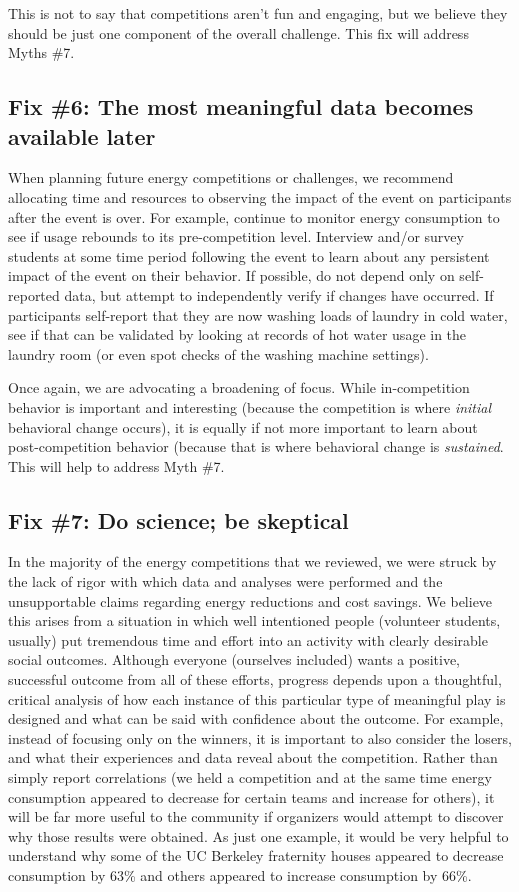 \documentclass[jou]{apa} %
\begin{document}
This is not to say that competitions aren't fun and engaging, but we believe they should
be just one component of the overall challenge.  This fix will address Myths \#7.

\subsection{Fix \#6: The most meaningful data becomes available later}

When planning future energy competitions or challenges, we recommend allocating time and
resources to observing the impact of the event on participants after the event is over.
For example, continue to monitor energy consumption to see if usage rebounds to its
pre-competition level.  Interview and/or survey students at some time period following the
event to learn about any persistent impact of the event on their behavior.  If possible,
do not depend only on self-reported data, but attempt to independently verify if changes
have occurred.  If participants self-report that they are now washing loads of laundry in
cold water,  see if that can be validated by looking at records of hot water usage in the
laundry room (or even spot checks of the washing machine settings). 

Once again, we are advocating a broadening of focus.   While in-competition behavior is
important and interesting (because the competition is where {\em initial} behavioral change
occurs), it is equally if not more important to learn about post-competition behavior
(because that is where behavioral change is {\em sustained}.  This will help to address
Myth \#7.

\subsection{Fix \#7: Do science; be skeptical}

In the majority of the energy competitions that we reviewed, we were struck by the lack of
rigor with which data and analyses were performed and the unsupportable claims regarding
energy reductions and cost savings.  We believe this arises from a situation in which well
intentioned people (volunteer students, usually) put tremendous time and effort into an
activity with clearly desirable social outcomes.  Although everyone (ourselves included)
wants a positive, successful outcome from all of these efforts, progress depends upon a
thoughtful, critical analysis of how each instance of this particular type of meaningful
play is designed and what can be said with confidence about the outcome.  For example,
instead of focusing only on the winners, it is important to also consider the losers, and
what their experiences and data reveal about the competition.  Rather than simply report
correlations (we held a competition and at the same time energy consumption appeared to
decrease for certain teams and increase for others), it will be far more useful to the
community if organizers would attempt to discover why those results were obtained.  As
just one example, it would be very helpful to understand why some of the UC Berkeley
fraternity houses appeared to decrease consumption by 63\% and others appeared to increase
consumption by 66\%. 
\end{document}
